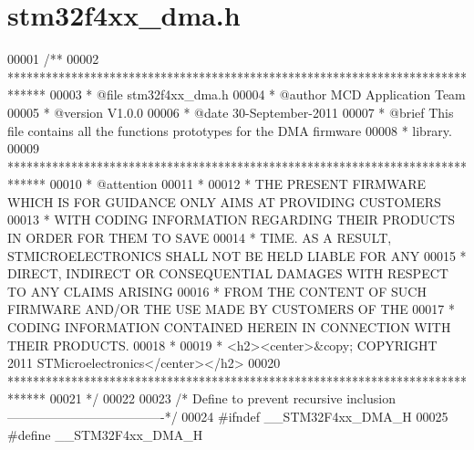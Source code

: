 \section{stm32f4xx\+\_\+dma.\+h}
\label{stm32f4xx__dma_8h_source}

\begin{DoxyCode}
00001 \textcolor{comment}{/**}
00002 \textcolor{comment}{  ******************************************************************************}
00003 \textcolor{comment}{  * @file    stm32f4xx\_dma.h}
00004 \textcolor{comment}{  * @author  MCD Application Team}
00005 \textcolor{comment}{  * @version V1.0.0}
00006 \textcolor{comment}{  * @date    30-September-2011}
00007 \textcolor{comment}{  * @brief   This file contains all the functions prototypes for the DMA firmware }
00008 \textcolor{comment}{  *          library.}
00009 \textcolor{comment}{  ******************************************************************************}
00010 \textcolor{comment}{  * @attention}
00011 \textcolor{comment}{  *}
00012 \textcolor{comment}{  * THE PRESENT FIRMWARE WHICH IS FOR GUIDANCE ONLY AIMS AT PROVIDING CUSTOMERS}
00013 \textcolor{comment}{  * WITH CODING INFORMATION REGARDING THEIR PRODUCTS IN ORDER FOR THEM TO SAVE}
00014 \textcolor{comment}{  * TIME. AS A RESULT, STMICROELECTRONICS SHALL NOT BE HELD LIABLE FOR ANY}
00015 \textcolor{comment}{  * DIRECT, INDIRECT OR CONSEQUENTIAL DAMAGES WITH RESPECT TO ANY CLAIMS ARISING}
00016 \textcolor{comment}{  * FROM THE CONTENT OF SUCH FIRMWARE AND/OR THE USE MADE BY CUSTOMERS OF THE}
00017 \textcolor{comment}{  * CODING INFORMATION CONTAINED HEREIN IN CONNECTION WITH THEIR PRODUCTS.}
00018 \textcolor{comment}{  *}
00019 \textcolor{comment}{  * <h2><center>&copy; COPYRIGHT 2011 STMicroelectronics</center></h2>}
00020 \textcolor{comment}{  ******************************************************************************  }
00021 \textcolor{comment}{  */}
00022 
00023 \textcolor{comment}{/* Define to prevent recursive inclusion -------------------------------------*/}
00024 \textcolor{preprocessor}{#}\textcolor{preprocessor}{ifndef} \textcolor{preprocessor}{\_\_STM32F4xx\_DMA\_H}
00025 \textcolor{preprocessor}{#}\textcolor{preprocessor}{define} \textcolor{preprocessor}{\_\_STM32F4xx\_DMA\_H}

\end{DoxyCode}
